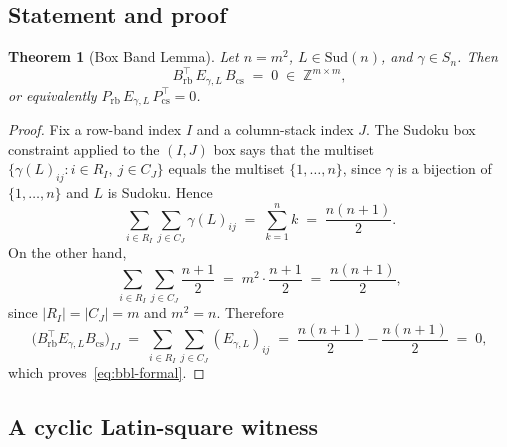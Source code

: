 \documentclass[11pt,a4paper]{article}
\newtheorem{theorem}{Theorem}[section]
\theoremstyle{definition}
\theoremstyle{remark}
\providecommand{\Z}{\mathbb{Z}}
\newcommand{\Egamma}{E_{\gamma,L}}
\newcommand{\Prb}{P_{\mathrm{rb}}}
\newcommand{\Pcs}{P_{\mathrm{cs}}}
\begin{document}
\subsection{Statement and proof}\label{sec:bbl-statement}

\begin{theorem}[Box Band Lemma]\label{thm:box-band}
Let $n = m^2$, $L \in \mathrm{Sud}(n)$, and $\gamma \in S_n$. Then
\begin{equation}\label{eq:bbl-formal}
   B_{\mathrm{rb}}^{\!\top} \, \Egamma \, B_{\mathrm{cs}}
   \;=\; 0
   \;\in\; \Z^{m \times m},
\end{equation}
or equivalently $\Prb \, \Egamma \, \Pcs^{\!\top} = 0$.
\end{theorem}

\begin{proof}
Fix a row-band index $I$ and a column-stack index $J$. The Sudoku box
constraint applied to the $(I,J)$ box says that the multiset
$\{ \gamma(L)_{ij} : i \in R_I,\ j \in C_J \}$ equals the multiset
$\{1, \dots, n\}$, since $\gamma$ is a bijection of $\{1,\dots,n\}$
and $L$ is Sudoku. Hence
\begin{equation*}
   \sum_{i \in R_I} \sum_{j \in C_J} \gamma(L)_{ij}
   \;=\; \sum_{k=1}^{n} k
   \;=\; \frac{n(n+1)}{2}.
\end{equation*}
On the other hand,
\begin{equation*}
   \sum_{i \in R_I} \sum_{j \in C_J} \frac{n+1}{2}
   \;=\; m^2 \cdot \frac{n+1}{2}
   \;=\; \frac{n(n+1)}{2},
\end{equation*}
since $|R_I| = |C_J| = m$ and $m^2 = n$. Therefore
\begin{equation*}
   \bigl(B_{\mathrm{rb}}^{\!\top} \Egamma B_{\mathrm{cs}}\bigr)_{IJ}
   \;=\; \sum_{i \in R_I} \sum_{j \in C_J} (\Egamma)_{ij}
   \;=\; \frac{n(n+1)}{2} - \frac{n(n+1)}{2}
   \;=\; 0,
\end{equation*}
which proves~\eqref{eq:bbl-formal}.
\end{proof}

\subsection{A cyclic Latin-square witness}\label{sec:bbl-failure}
\end{document}
